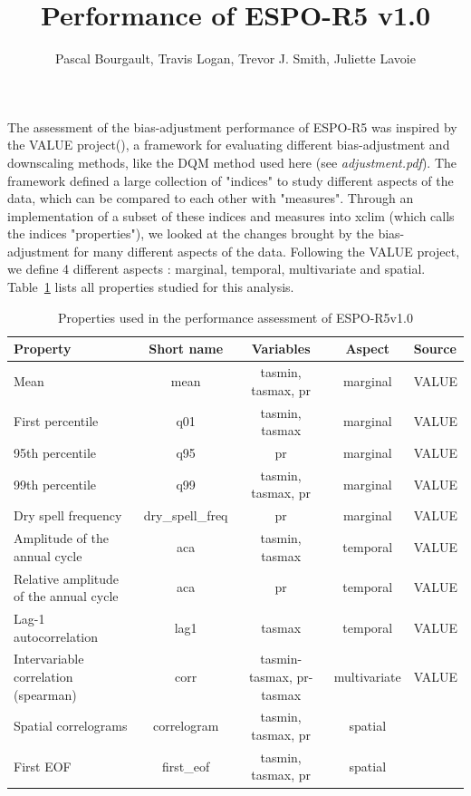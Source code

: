 \documentclass[letterpaper,10pt]{article}
\begin{document}
\title{Performance of ESPO-R5 v1.0}
\author{Pascal Bourgault, Travis Logan, Trevor J. Smith, Juliette Lavoie}
\maketitle

The assessment of the bias-adjustment performance of ESPO-R5 was inspired by the VALUE project(\cite{Maraun2015}), a framework for evaluating different bias-adjustment and downscaling methods, like the DQM method used here (see \emph{adjustment.pdf}). The framework defined a large collection of "indices" to study different aspects of the data, which can be compared to each other with "measures". Through an implementation of a subset of these indices and measures into xclim (which calls the indices "properties"), we looked at the changes brought by the bias-adjustment for many different aspects of the data. Following the VALUE project, we define 4 different aspects : marginal, temporal, multivariate and spatial. Table~\ref{tab:props} lists all properties studied for this analysis.

\begin{table}[!ht]
    \centering
    \caption{Properties used in the performance assessment of ESPO-R5v1.0}
    \begin{tabular}{l|c|c|c|l}
    \hline
    Property                               & Short name & Variables          & Aspect   & Source \\ \hline
    Mean                                   & mean       & tasmin, tasmax, pr & marginal & VALUE \\ \hline
    First percentile                       & q01        & tasmin, tasmax     & marginal & VALUE \\ \hline
    95th percentile                        & q95        & pr                 & marginal & VALUE \\ \hline
    99th percentile                        & q99        & tasmin, tasmax, pr & marginal & VALUE \\ \hline
    Dry spell frequency                    & dry\_spell\_freq & pr           & marginal & VALUE \\ \hline
    Amplitude of the annual cycle          & aca        & tasmin, tasmax     & temporal & VALUE \\ \hline
    Relative amplitude of the annual cycle & aca        & pr                 & temporal & VALUE \\ \hline
    Lag-1 autocorrelation                  & lag1       & tasmax             & temporal & VALUE \\ \hline
    Intervariable correlation (spearman)   & corr       & tasmin-tasmax, pr-tasmax & multivariate & VALUE \\ \hline
    Spatial correlograms                   & correlogram & tasmin, tasmax, pr & spatial & \cite{Francois2020} \\\hline
    First EOF                              & first\_eof & tasmin, tasmax, pr & spatial & \cite{Vrac2018} \\ \hline
    \end{tabular}
    \label{tab:props}

\end{table}
\end{document}
